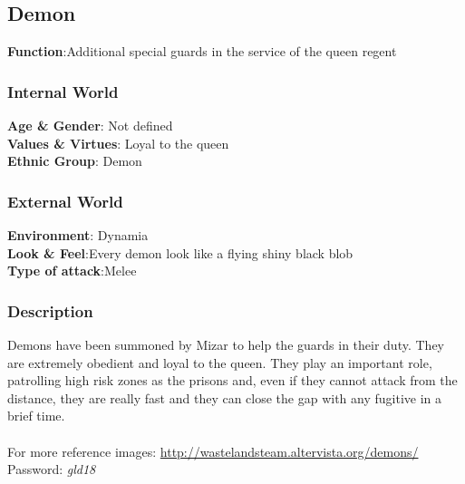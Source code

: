 \subsection{Demon}

\begin{minipage}{0.5\textwidth}
\textbf{Function}:Additional special guards in the service of the queen regent

\subsubsection{Internal World}

\textbf{Age \& Gender}: Not defined \\
\textbf{Values \& Virtues}: Loyal to the queen\\
\textbf{Ethnic Group}: Demon

\subsubsection{External World}
\textbf{Environment}: Dynamia \\
\textbf{Look \& Feel}:Every demon look like a flying shiny black blob\\
\textbf{Type of attack}:Melee \\
\end{minipage}%
%
\hfill\begin{minipage}{0.4\textwidth}
\end{minipage}


\subsubsection{Description}
Demons have been summoned by Mizar to help the guards in their duty. They are extremely obedient and loyal to the queen. They play an important role, patrolling high risk zones as the prisons and, even if they cannot attack from the distance, they are really fast and they can close the gap with any fugitive in a brief time.\\\\
For more reference images: \href{http://wastelandsteam.altervista.org/demons/}{http://wastelandsteam.altervista.org/demons/}\\
Password: \textit{gld18}

